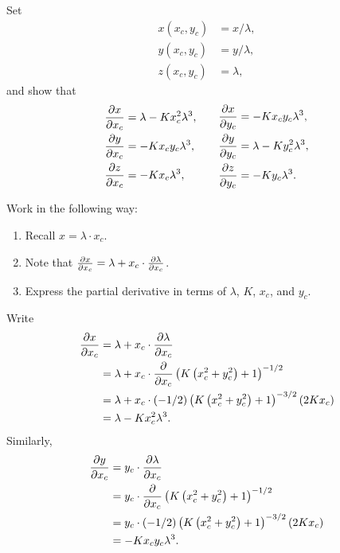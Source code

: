 \documentclass{ximera}
\begin{document}
\begin{problem}
  Set
  \begin{align*}
    x(x_c,y_c) &=x/\lambda,\\
    y(x_c,y_c) &=y/\lambda,\\
    z(x_c,y_c) &=\lambda,
  \end{align*}
  and show that
  \[
  \begin{split}
    \pp[x]{x_c} &=\lambda -Kx_c^2 \lambda^3,\\
    \pp[y]{x_c} &=-Kx_cy_c \lambda^3,\\
    \pp[z]{x_c} &=-Kx_c \lambda^3,
  \end{split}
  \qquad
  \begin{split}
    \pp[x]{y_c} &= -Kx_cy_c \lambda^3,\\
    \pp[y]{y_c} &= \lambda - Ky_c^2 \lambda^3,\\
    \pp[z]{y_c} &= -Ky_c \lambda^3.
  \end{split}
  \]
  \begin{hint}
  Work in the following way:
  \begin{enumerate}
  \item Recall $x = \lambda\cdot x_c$.
  \item Note that $\pp[x]{x_c} = \lambda + x_c \cdot \pp[\lambda]{x_c}$.
    \item Express the partial derivative in terms of $\lambda$, $K$, $x_c$,
      and $y_c$.
  \end{enumerate}
\end{hint}
  \begin{freeResponse}
    Write
  \begin{align*}
    \pp[x]{x_c} &= \lambda  + x_c \cdot \pp[\lambda]{x_c}\\
    &= \lambda + x_c \cdot \pp{x_c} \left(K\left(x_c^2 + y_c^2\right)+1\right)^{-1/2}\\
    &= \lambda + x_c \cdot (-1/2)\left(K\left(x_c^2 + y_c^2\right)+1\right)^{-3/2}(2Kx_c)\\
    &= \lambda -Kx_c^2 \lambda^3.
  \end{align*}
  Similarly,
    \begin{align*}
    \pp[y]{x_c} &= y_c \cdot \pp[\lambda]{x_c}\\
    &= y_c \cdot \pp{x_c} \left(K\left(x_c^2 + y_c^2\right)+1\right)^{-1/2}\\
    &= y_c \cdot (-1/2)\left(K\left(x_c^2 + y_c^2\right)+1\right)^{-3/2}(2Kx_c)\\
    &= -Kx_cy_c \lambda^3.
    \end{align*}

\end{freeResponse}
\end{problem}
\end{document}
